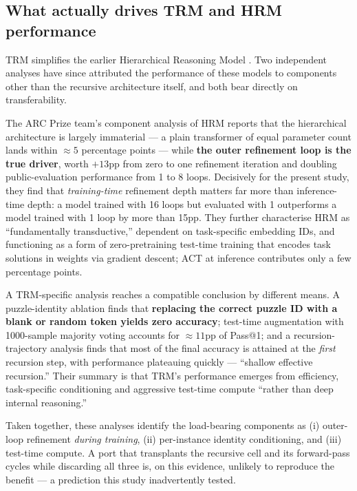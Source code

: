 \documentclass[11pt]{article}
\begin{document}
\subsection{What actually drives TRM and HRM performance}
\label{sec:drivers}

TRM simplifies the earlier Hierarchical Reasoning Model \citep{wang2025hrm}. Two independent analyses have since attributed the performance of these models to components other than the recursive architecture itself, and both bear directly on transferability.

The ARC Prize team's component analysis of HRM \citep{arcprize2025hrm} reports that the hierarchical architecture is largely immaterial --- a plain transformer of equal parameter count lands within ${\approx}5$ percentage points --- while \textbf{the outer refinement loop is the true driver}, worth $+13$pp from zero to one refinement iteration and doubling public-evaluation performance from 1 to 8 loops. Decisively for the present study, they find that \emph{training-time} refinement depth matters far more than inference-time depth: a model trained with 16 loops but evaluated with 1 outperforms a model trained with 1 loop by more than 15pp. They further characterise HRM as ``fundamentally transductive,'' dependent on task-specific embedding IDs, and functioning as a form of zero-pretraining test-time training that encodes task solutions in weights via gradient descent; ACT at inference contributes only a few percentage points.

A TRM-specific analysis \citep{royeazar2026trm} reaches a compatible conclusion by different means. A puzzle-identity ablation finds that \textbf{replacing the correct puzzle ID with a blank or random token yields zero accuracy}; test-time augmentation with 1000-sample majority voting accounts for ${\approx}11$pp of Pass@1; and a recursion-trajectory analysis finds that most of the final accuracy is attained at the \emph{first} recursion step, with performance plateauing quickly --- ``shallow effective recursion.'' Their summary is that TRM's performance emerges from efficiency, task-specific conditioning and aggressive test-time compute ``rather than deep internal reasoning.''

Taken together, these analyses identify the load-bearing components as (i) outer-loop refinement \emph{during training}, (ii) per-instance identity conditioning, and (iii) test-time compute. A port that transplants the recursive cell and its forward-pass cycles while discarding all three is, on this evidence, unlikely to reproduce the benefit --- a prediction this study inadvertently tested.
\end{document}
